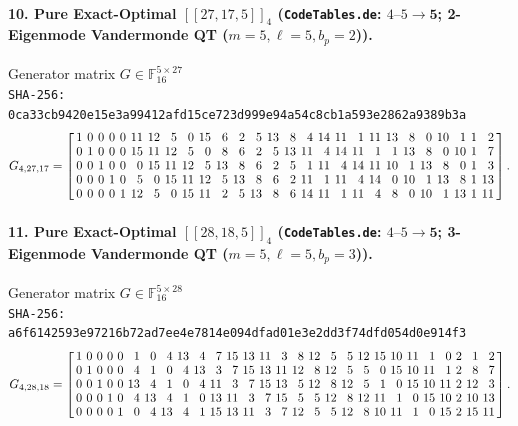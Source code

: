 \documentclass[11pt,a4paper]{article}
\theoremstyle{remark}
\begin{document}
\paragraph{10. Pure Exact-Optimal $[[27,17,5]]_{4}$ (\texttt{CodeTables.de}: $4\text{--}5 \to \mathbf{5}$; 2-Eigenmode Vandermonde QT ($m=5, \ell=5, b_p=2$)).} Generator matrix $G \in \mathbb{F}_{16}^{5 \times 27}$\\
{\footnotesize\texttt{SHA-256: 0ca33cb9420e15e3a99412afd15ce723d999e94a54c8cb1a593e2862a9389b3a}}
{\scriptsize\[
G_{4,27,17} = \setlength{\arraycolsep}{1.95pt}\renewcommand{\arraystretch}{0.95}
\left[\begin{array}{*{27}{r}}
1 & 0 & 0 & 0 & 0 & 11 & 12 & 5 & 0 & 15 & 6 & 2 & 5 & 13 & 8 & 4 & 14 & 11 & 1 & 11 & 13 & 8 & 0 & 10 & 1 & 1 & 2 \\
0 & 1 & 0 & 0 & 0 & 15 & 11 & 12 & 5 & 0 & 8 & 6 & 2 & 5 & 13 & 11 & 4 & 14 & 11 & 1 & 1 & 13 & 8 & 0 & 10 & 1 & 7 \\
0 & 0 & 1 & 0 & 0 & 0 & 15 & 11 & 12 & 5 & 13 & 8 & 6 & 2 & 5 & 1 & 11 & 4 & 14 & 11 & 10 & 1 & 13 & 8 & 0 & 1 & 3 \\
0 & 0 & 0 & 1 & 0 & 5 & 0 & 15 & 11 & 12 & 5 & 13 & 8 & 6 & 2 & 11 & 1 & 11 & 4 & 14 & 0 & 10 & 1 & 13 & 8 & 1 & 13 \\
0 & 0 & 0 & 0 & 1 & 12 & 5 & 0 & 15 & 11 & 2 & 5 & 13 & 8 & 6 & 14 & 11 & 1 & 11 & 4 & 8 & 0 & 10 & 1 & 13 & 1 & 11
\end{array}\right].
\]}

\paragraph{11. Pure Exact-Optimal $[[28,18,5]]_{4}$ (\texttt{CodeTables.de}: $4\text{--}5 \to \mathbf{5}$; 3-Eigenmode Vandermonde QT ($m=5, \ell=5, b_p=3$)).} Generator matrix $G \in \mathbb{F}_{16}^{5 \times 28}$\\
{\footnotesize\texttt{SHA-256: a6f6142593e97216b72ad7ee4e7814e094dfad01e3e2dd3f74dfd054d0e914f3}}
{\scriptsize\[
G_{4,28,18} = \setlength{\arraycolsep}{1.75pt}\renewcommand{\arraystretch}{0.95}
\left[\begin{array}{*{28}{r}}
1 & 0 & 0 & 0 & 0 & 1 & 0 & 4 & 13 & 4 & 7 & 15 & 13 & 11 & 3 & 8 & 12 & 5 & 5 & 12 & 15 & 10 & 11 & 1 & 0 & 2 & 1 & 2 \\
0 & 1 & 0 & 0 & 0 & 4 & 1 & 0 & 4 & 13 & 3 & 7 & 15 & 13 & 11 & 12 & 8 & 12 & 5 & 5 & 0 & 15 & 10 & 11 & 1 & 2 & 8 & 7 \\
0 & 0 & 1 & 0 & 0 & 13 & 4 & 1 & 0 & 4 & 11 & 3 & 7 & 15 & 13 & 5 & 12 & 8 & 12 & 5 & 1 & 0 & 15 & 10 & 11 & 2 & 12 & 3 \\
0 & 0 & 0 & 1 & 0 & 4 & 13 & 4 & 1 & 0 & 13 & 11 & 3 & 7 & 15 & 5 & 5 & 12 & 8 & 12 & 11 & 1 & 0 & 15 & 10 & 2 & 10 & 13 \\
0 & 0 & 0 & 0 & 1 & 0 & 4 & 13 & 4 & 1 & 15 & 13 & 11 & 3 & 7 & 12 & 5 & 5 & 12 & 8 & 10 & 11 & 1 & 0 & 15 & 2 & 15 & 11
\end{array}\right].
\]}
\end{document}

